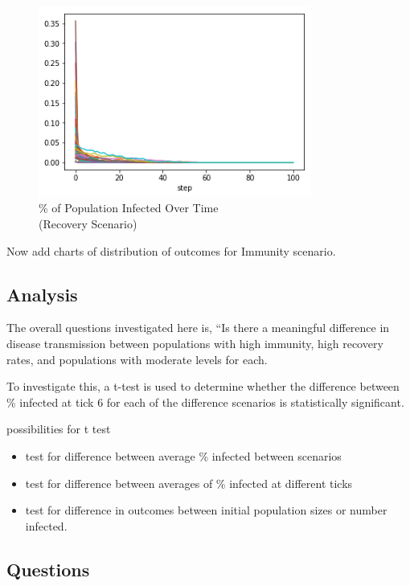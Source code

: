 \documentclass[11pt]{article} %
\begin{document}

\begin{figure}
\centering
\includegraphics[width=0.8\textwidth]{recovery_steady_state}
\caption{\% of Population Infected Over Time \\ (Recovery Scenario)}
\end{figure}

Now add charts of distribution of outcomes for Immunity scenario. 


\subsection{Analysis}

The overall questions investigated here is, ``Is there a meaningful difference in disease transmission between populations with high immunity, high recovery rates, and populations with moderate levels for each. 

To investigate this, a t-test is used to determine whether the difference between \% infected at tick 6 for each of the difference scenarios is statistically significant. 




possibilities for t test
\begin{itemize}
\item test for difference between average \% infected between scenarios
\item test for difference between averages of \% infected at different ticks
\item test for difference in outcomes between initial population sizes or number infected. 
\end{itemize}

\subsection{Questions}
\end{document}
